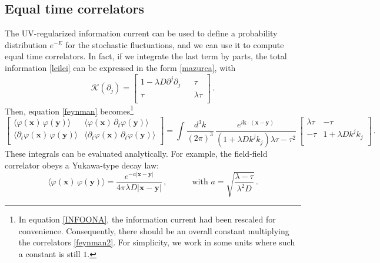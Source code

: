 \documentclass[a4paper, amsfonts, amssymb, amsmath, reprint, showkeys, nofootinbib, twoside,notitlepage,onecolumn,preprintnumbers]{revtex4-2}
\newcommand{\spc}{\quad \quad \quad}
\theoremstyle{definition}
\theoremstyle{theorem}
\theoremstyle{corollary}
\begin{document}
\subsection{Equal time correlators}\label{causuzzuz}

The UV-regularized information current can be used to define a probability distribution $e^{-E}$ for the stochastic fluctuations, and we can use it to compute equal time correlators. In  fact, if we integrate the last term by parts,  the total information \eqref{leilei} can be expressed in the form \eqref{mazurca}, with
\begin{equation}
    \mathcal{K}(\partial_j) = 
    \begin{bmatrix}
     1 {-}\lambda D \partial^j \partial_j &  & \tau \\
     \tau &  & \lambda \tau \\
    \end{bmatrix} \, .
\end{equation}
Then, equation \eqref{feynman} becomes\footnote{In equation \eqref{INFOONA}, the information current had been rescaled for convenience. Consequently, there should be an overall constant multiplying the correlators \eqref{feynman2}. For simplicity, we work in some units where such a constant is still $1$.}
\begin{equation}\label{feynman2}
\begin{bmatrix}
  \langle \varphi(\textbf{x}) \, \varphi(\textbf{y}) \rangle   &  \langle \varphi(\textbf{x}) \, \partial_t \varphi(\textbf{y}) \rangle\\
   \langle \partial_t \varphi(\textbf{x}) \, \varphi(\textbf{y}) \rangle  & \langle \partial_t  \varphi(\textbf{x}) \, \partial_t \varphi(\textbf{y}) \rangle \\
\end{bmatrix}
     = \int \dfrac{d^3 k}{(2\pi)^3} \, \dfrac{ e^{i\textbf{k}\cdot (\textbf{x}-\textbf{y})}}{(1{+}\lambda D k^j k_j)\lambda \tau {-}\tau^2} \, \begin{bmatrix}
         \lambda \tau & -\tau \\
         -\tau &  1{+}\lambda D k^j k_j \\
     \end{bmatrix} \, .
\end{equation}
These integrals can be evaluated analytically. For example, the field-field correlator obeys a Yukawa-type decay law:
\begin{equation}\label{Yuks}
   \langle \varphi(\textbf{x}) \, \varphi(\textbf{y}) \rangle  = \dfrac{e^{-a|\textbf{x}-\textbf{y}|}}{4\pi \lambda D |\textbf{x}-\textbf{y}|} \, , \spc \text{with }a=\sqrt{\dfrac{\lambda-\tau}{\lambda^2 D}} \, . 
\end{equation}
\end{document}
